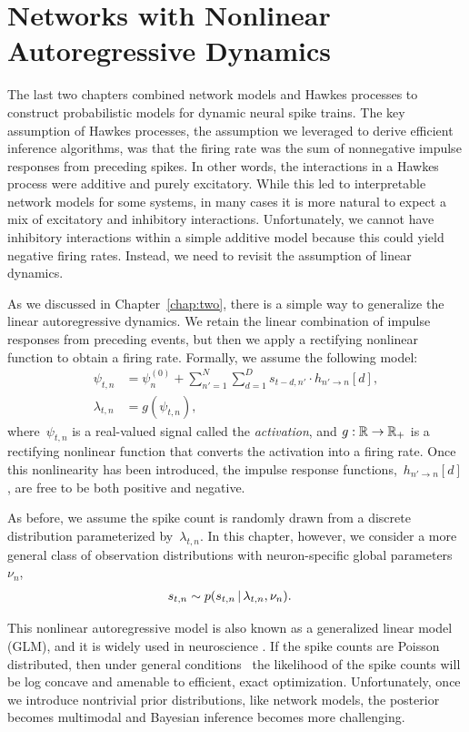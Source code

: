 
\chapter{Networks with Nonlinear Autoregressive Dynamics}
\label{chap:five}

The last two chapters combined network models and Hawkes processes to
construct probabilistic models for dynamic neural spike trains. The
key assumption of Hawkes processes, the assumption we leveraged to
derive efficient inference algorithms, was that the firing rate was the
sum of nonnegative impulse responses from preceding spikes. In other
words, the interactions in a Hawkes process were additive and purely
excitatory. While this led to interpretable network models for some
systems, in many cases it is more natural to expect a mix of
excitatory and inhibitory interactions. Unfortunately, we cannot have
inhibitory interactions within a simple additive model because this could
yield negative firing rates. Instead, we need to revisit the
assumption of linear dynamics.

As we discussed in Chapter~\ref{chap:two}, there is a simple way to
generalize the linear autoregressive dynamics. We retain the linear
combination of impulse responses from preceding events, but then we
apply a rectifying nonlinear function to obtain a firing rate.
Formally, we assume the following model:
\begin{align*}
  \psi_{t,n}
  &= \psi_{n}^{(0)} + \sum_{n'=1}^N \sum_{d=1}^{D} s_{t-d, n'} \cdot h_{n' \to n}[d], \\
  \lambda_{t,n} &= g(\psi_{t,n}),
\end{align*}
where~$\psi_{t,n}$ is a real-valued signal called the
\emph{activation}, and ${g: \mathbb{R} \to \mathbb{R}_+}$ is a rectifying
nonlinear function that converts the activation into a firing rate.
Once this nonlinearity has been introduced, the impulse response
functions,~$h_{n' \to n}[d]$, are free to be both positive and negative.

As before, we assume the spike count is randomly drawn from a discrete
distribution parameterized by~$\lambda_{t,n}$. In this chapter, however,
we consider a more general class of observation distributions with
neuron-specific global parameters~$\nu_n$,
\begin{align*}
  s_{t,n} &\sim p(s_{t,n} \,|\, \lambda_{t,n}, \nu_n).
\end{align*}

This nonlinear autoregressive model is also known as a generalized
linear model (GLM), and it is widely used in neuroscience
\citep{Paninski-2004, Truccolo-2005, Pillow-2008}. If the spike
counts are Poisson distributed, then under general
conditions~\citep{Paninski-2004} the likelihood of the spike counts
will be log concave and amenable to efficient, exact
optimization. Unfortunately, once we introduce nontrivial prior
distributions, like network models, the
posterior becomes multimodal and Bayesian inference becomes more
challenging.

